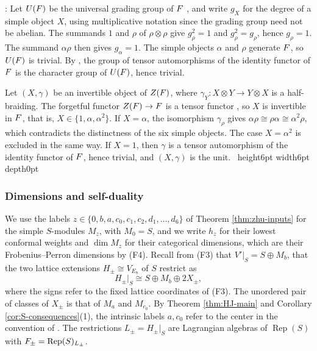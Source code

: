 \documentclass[leqno]{article}
\let\cal\relax
\newcommand{\cal}{\mathcal}
\newcommand{\qed}{\hfill \vrule height6pt  width6pt depth0pt}
\newcommand{\co}{\colon}
\newcommand{\ot}{\otimes}
\DeclareMathOperator{\Rep}{Rep}
\newenvironment{proof}[1][]{\noindent {\it Proof #1} : }{\hbox{~}\qed
\smallskip
}
\numberwithin{equation}{section}
\begin{document}
\begin{proof}
Let $U(\cal F)$ be the universal grading group of $\cal F$ \cite[Definition 4.14.2]{EGNO15}, and write $g_X$ for the degree of a simple object $X$, using multiplicative notation since the grading group need not be abelian. The summands $1$ and $\rho$ of $\rho\ot\rho$ give $g_\rho^2 = 1$ and $g_\rho^2 = g_\rho$, hence $g_\rho = 1$. The summand $\alpha\rho$ then gives $g_\alpha = 1$. The simple objects $\alpha$ and $\rho$ generate $\cal F$, so $U(\cal F)$ is trivial. By \cite[Proposition 4.14.3]{EGNO15}, the group of tensor automorphisms of the identity functor of $\cal F$ is the character group of $U(\cal F)$, hence trivial.

Let $(X,\gamma)$ be an invertible object of $Z(\cal F)$, where $\gamma_Y \co X \ot Y \to Y \ot X$ is a half-braiding. The forgetful functor $Z(\cal F) \to \cal F$ is a tensor functor \cite[Remark 7.13.4]{EGNO15}, so $X$ is invertible in $\cal F$, that is, $X \in \{1,\alpha,\alpha^2\}$. If $X = \alpha$, the isomorphism $\gamma_\rho$ gives $\alpha\rho \cong \rho\alpha \cong \alpha^2\rho$, which contradicts the distinctness of the six simple objects. The case $X = \alpha^2$ is excluded in the same way. If $X = 1$, then $\gamma$ is a tensor automorphism of the identity functor of $\cal F$, hence trivial, and $(X,\gamma)$ is the unit.
\end{proof}


\subsubsection{Dimensions and self-duality}

We use the labels $z \in \{0,b,a,c_0,c_1,c_2,d_1,\ldots,d_6\}$ of Theorem \ref{thm:zhu-inputs} for the simple $S$-modules $M_z$, with $M_0 = S$, and we write $h_z$ for their lowest conformal weights and $\dim M_z$ for their categorical dimensions, which are their Frobenius--Perron dimensions by (F4). Recall from (F3) that $V'|_S = S \oplus M_b$, that the two lattice extensions $H_\pm \cong V_{E_8}$ of $S$ restrict as
\begin{equation}
\label{eq:lagrangian-restriction}
H_\pm|_S \cong S \oplus M_b \oplus 2X_\pm,
\end{equation}
where the signs refer to the fixed lattice coordinates of (F3). The unordered pair of classes of $X_\pm$ is that of $M_a$ and $M_{c_0}$. By Theorem \ref{thm:HJ-main} and Corollary \ref{cor:S-consequences}(1), the intrinsic labels $a,c_0$ refer to the center in the convention of \cite{EvG11,ArhII}. The restrictions $L_\pm = H_\pm|_S$ are Lagrangian algebras of $\Rep(S)$ with $\cal F_\pm = \Rep(S)_{L_\pm}$.
\end{document}
